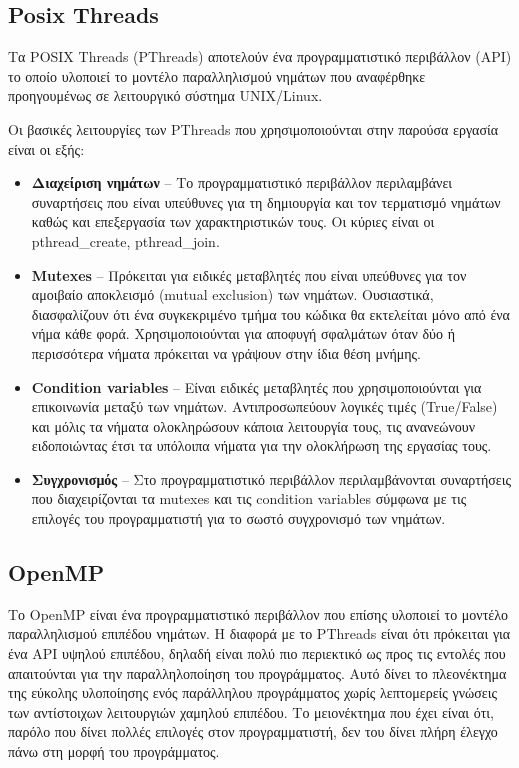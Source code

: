 \documentclass[12pt,a4paper]{article}
\begin{document}
\subsection{Posix Threads}

Τα POSIX Threads (PThreads) \cite{noauthor_posix_2018} αποτελούν ένα προγραμματιστικό περιβάλλον (API) το οποίο υλοποιεί το μοντέλο παραλληλισμού νημάτων που αναφέρθηκε προηγουμένως σε λειτουργικό σύστημα UNIX/Linux.

Οι βασικές λειτουργίες των PThreads που χρησιμοποιούνται στην παρούσα εργασία είναι οι εξής:

\begin{itemize}
\item \textbf{Διαχείριση νημάτων} -- Το προγραμματιστικό περιβάλλον περιλαμβάνει συναρτήσεις που είναι υπεύθυνες για τη δημιουργία και τον τερματισμό νημάτων καθώς και επεξεργασία των χαρακτηριστικών τους. Οι κύριες είναι οι pthread\_create, pthread\_join.
\item \textbf{Mutexes} -- Πρόκειται για ειδικές μεταβλητές που είναι υπεύθυνες για τον αμοιβαίο αποκλεισμό (mutual exclusion) των νημάτων. Ουσιαστικά, διασφαλίζουν ότι ένα συγκεκριμένο τμήμα του κώδικα θα εκτελείται μόνο από ένα νήμα κάθε φορά. Χρησιμοποιούνται για αποφυγή σφαλμάτων όταν δύο ή περισσότερα νήματα πρόκειται να γράψουν στην ίδια θέση μνήμης.
\item \textbf{Condition variables} -- Είναι ειδικές μεταβλητές που χρησιμοποιούνται για επικοινωνία μεταξύ των νημάτων. Αντιπροσωπεύουν λογικές τιμές (True/False) και μόλις τα νήματα ολοκληρώσουν κάποια λειτουργία τους, τις ανανεώνουν ειδοποιώντας έτσι τα υπόλοιπα νήματα για την ολοκλήρωση της εργασίας τους.
\item \textbf{Συγχρονισμός} -- Στο προγραμματιστικό περιβάλλον περιλαμβάνονται συναρτήσεις που διαχειρίζονται τα mutexes και τις condition variables σύμφωνα με τις επιλογές του προγραμματιστή για το σωστό συγχρονισμό των νημάτων.
\end{itemize}

\subsection{OpenMP}
Το OpenMP είναι ένα προγραμματιστικό περιβάλλον που επίσης υλοποιεί το μοντέλο παραλληλισμού επιπέδου νημάτων. Η διαφορά με το PThreads είναι ότι πρόκειται για ένα API υψηλού επιπέδου, δηλαδή είναι πολύ πιο περιεκτικό ως προς τις εντολές που απαιτούνται για την παραλληλοποίηση του προγράμματος. Αυτό δίνει το πλεονέκτημα της εύκολης υλοποίησης ενός παράλληλου προγράμματος χωρίς λεπτομερείς γνώσεις των αντίστοιχων λειτουργιών χαμηλού επιπέδου. Το μειονέκτημα που έχει είναι ότι, παρόλο που δίνει πολλές επιλογές στον προγραμματιστή, δεν του δίνει πλήρη έλεγχο πάνω στη μορφή του προγράμματος.
\end{document}
